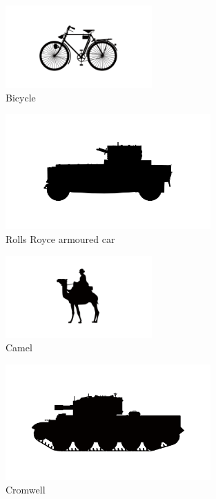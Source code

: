 \begin{figure}[h]
  \centering
  \includegraphics[width=0.5\textwidth]{platforms/bicycle.pdf}
  \caption*{Bicycle}
\end{figure}

\begin{figure}[h]
  \centering
  \includegraphics[width=0.7\textwidth]{platforms/rolls-royce.pdf}
  \caption*{Rolls Royce armoured car}
\end{figure}

\begin{figure}[h]
  \centering
  \includegraphics[width=0.5\textwidth]{platforms/camel.pdf}
  \caption*{Camel}
\end{figure}

\begin{figure}[h]
  \centering
  \includegraphics[width=0.7\textwidth]{platforms/cromwell.pdf}
  \caption*{Cromwell}
\end{figure}

